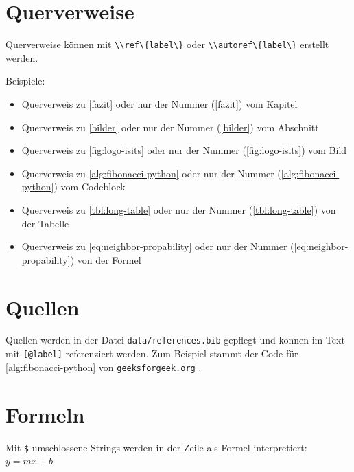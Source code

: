 \documentclass[
  11pt,
  a4paper,
  openright,
  cleardoublepage=plain,
  parskip=half+, %
]{scrreprt}
\newcommand{\passthrough}[1]{#1}
\providecommand{\tightlist}{%
  \setlength{\itemsep}{0pt}\setlength{\parskip}{0pt}}
\begin{document}
\hypertarget{querverweise}{%
\section{Querverweise}\label{querverweise}}

Querverweise können mit \passthrough{\lstinline!\\ref\{label\}!} oder
\passthrough{\lstinline!\\autoref\{label\}!} erstellt werden.

Beispiele:

\begin{itemize}
\tightlist
\item
  Querverweis zu \autoref{fazit} oder nur der Nummer (\ref{fazit}) vom
  Kapitel
\item
  Querverweis zu \autoref{bilder} oder nur der Nummer (\ref{bilder}) vom
  Abschnitt
\item
  Querverweis zu \autoref{fig:logo-isits} oder nur der Nummer
  (\ref{fig:logo-isits}) vom Bild
\item
  Querverweis zu \autoref{alg:fibonacci-python} oder nur der Nummer
  (\ref{alg:fibonacci-python}) vom Codeblock
\item
  Querverweis zu \autoref{tbl:long-table} oder nur der Nummer
  (\ref{tbl:long-table}) von der Tabelle
\item
  Querverweis zu \autoref{eq:neighbor-propability} oder nur der Nummer
  (\ref{eq:neighbor-propability}) von der Formel
\end{itemize}

\hypertarget{quellen}{%
\section{Quellen}\label{quellen}}

Quellen werden in der Datei
\passthrough{\lstinline!data/references.bib!} gepflegt und konnen im
Text mit \passthrough{\lstinline![@label]!} referenziert werden. Zum
Beispiel stammt der Code für \autoref{alg:fibonacci-python} von
\passthrough{\lstinline!geeksforgeek.org!} \citep{fibonacci-python}.

\hypertarget{formeln}{%
\section{Formeln}\label{formeln}}

Mit \passthrough{\lstinline!$!} umschlossene Strings werden in der Zeile
als Formel interpretiert: \(y = mx +b\)
\end{document}
